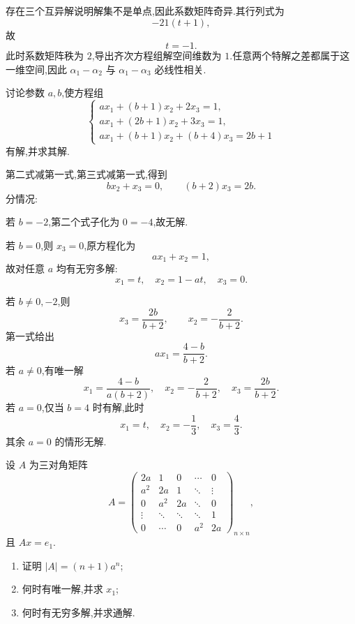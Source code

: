\begin{solution}
存在三个互异解说明解集不是单点,因此系数矩阵奇异.其行列式为
\[
-21(t+1),
\]
故
\[
\boxed{t=-1}.
\]
此时系数矩阵秩为 $2$,导出齐次方程组解空间维数为 $1$.任意两个特解之差都属于这一维空间,因此 $\alpha_1-\alpha_2$ 与 $\alpha_1-\alpha_3$ 必线性相关.
\end{solution}

\begin{example}
讨论参数 $a,b$,使方程组
\[
\begin{cases}
ax_1+(b+1)x_2+2x_3=1,\\
ax_1+(2b+1)x_2+3x_3=1,\\
ax_1+(b+1)x_2+(b+4)x_3=2b+1
\end{cases}
\]
有解,并求其解.
\end{example}
\exampleblank

\begin{solution}
第二式减第一式,第三式减第一式,得到
\[
bx_2+x_3=0,
\qquad
(b+2)x_3=2b.
\]
分情况:

若 $b=-2$,第二个式子化为 $0=-4$,故无解.

若 $b=0$,则 $x_3=0$,原方程化为
\[
ax_1+x_2=1,
\]
故对任意 $a$ 均有无穷多解:
\[
\boxed{x_1=t,\quad x_2=1-at,\quad x_3=0}.
\]

若 $b\neq0,-2$,则
\[
x_3=\dfrac{2b}{b+2},
\qquad
x_2=-\dfrac{2}{b+2}.
\]
第一式给出
\[
a x_1=\dfrac{4-b}{b+2}.
\]
若 $a\neq0$,有唯一解
\[
\boxed{
 x_1=\dfrac{4-b}{a(b+2)},
 \quad x_2=-\dfrac{2}{b+2},
 \quad x_3=\dfrac{2b}{b+2}
 }.
\]
若 $a=0$,仅当 $b=4$ 时有解,此时
\[
\boxed{x_1=t,\quad x_2=-\dfrac13,\quad x_3=\dfrac43}.
\]
其余 $a=0$ 的情形无解.
\end{solution}

\begin{example}
设 $A$ 为三对角矩阵
\[
A=
\begin{pmatrix}
2a&1&0&\cdots&0\\
a^2&2a&1&\ddots&\vdots\\
0&a^2&2a&\ddots&0\\
\vdots&\ddots&\ddots&\ddots&1\\
0&\cdots&0&a^2&2a
\end{pmatrix}_{n\times n},
\]
且 $Ax=e_1$.
\begin{enumerate}
  \item 证明 $|A|=(n+1)a^n$;
  \item 何时有唯一解,并求 $x_1$;
  \item 何时有无穷多解,并求通解.
\end{enumerate}
\end{example}
\exampleblank


